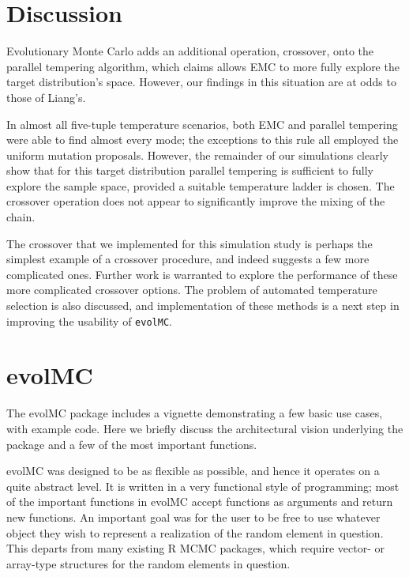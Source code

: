 \documentclass[12pt]{article}\usepackage[]{graphicx}\usepackage[]{color}
\begin{document}
\section{Discussion}
\label{sec:discussion}

Evolutionary Monte Carlo adds an additional operation, crossover, onto
the parallel tempering algorithm, which \cite{Liang:2011} claims
allows EMC to more fully explore the target distribution's space.
However, our findings in this situation are at odds to those of Liang's.

In almost all five-tuple temperature scenarios, both EMC and parallel
tempering were able to find almost every mode; the exceptions to this
rule all employed the uniform mutation proposals.  However, the
remainder of our simulations clearly show that for this target
distribution parallel tempering is sufficient to fully explore the
sample space, provided a suitable temperature ladder is chosen. The
crossover operation does not appear to significantly improve the
mixing of the chain.

The crossover that we implemented for this simulation study is perhaps
the simplest example of a crossover procedure, and indeed
\cite{Liang:2011} suggests a few more complicated ones. Further work
is warranted to explore the performance of these more complicated
crossover options. The problem of automated temperature selection is
also discussed, and implementation of these methods is a next step in
improving the usability of {\tt evolMC}.


 

\appendix

\section{evolMC}
\label{sec:evolmc}
The evolMC package includes a vignette demonstrating a few basic use cases, with example code. Here we briefly discuss the architectural vision underlying the package and a few of the most important functions.

evolMC was designed to be as flexible as possible, and hence it operates on a quite abstract level. It is written in a very functional style of programming; most of the important functions in evolMC accept functions as arguments and return new functions. An important goal was for the user to be free to use whatever object they wish to represent a realization of the random element in question. This departs from many existing R MCMC packages, which require vector- or array-type structures for the random elements in question.
\end{document}

